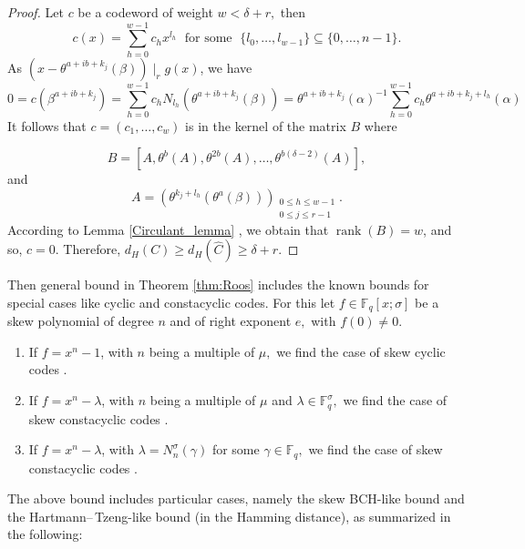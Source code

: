 \documentclass[12pt,paper]{article}
\theoremstyle{plain}
\newtheorem{remark}[theorem]{Remark}
\def\dsum #1#2{\displaystyle{\sum_{#1}^{#2}}}
\newcommand{\Fq}{\mathbb{F}_{q}}
\DeclareMathOperator{\rank}{rank}
\begin{document}
\begin{proof}
Let $c$ be a codeword of weight $ w <\delta+r, $ then 
				$$c(x) =\dsum{h=0}{w-1} c_{h}x^{l_h}\;\mbox{ for some }\;\{ l_{0},\ldots,l_{w-1}\}\subseteq\{ 0,\ldots,n-1\}. $$
As $ (x-{\theta^{a+ib+k_j}(\beta)}) \mid_r g(x)$, we have 
				$$ 0=c(\beta^{a+ib+k_j}) = \dsum{h=0}{w-1} c_{h} N_{l_h}(\theta^{a+ib+k_j}(\beta)) = \theta^{a+ib+k_j}(\alpha)^{-1}\dsum{h=0}{w-1} c_{h} \theta^{a+ib+k_j+l_h}(\alpha)$$
It follows that  $ c=(c_1,\ldots,c_w)$ is in the kernel of the matrix $B$ where 

            $$ B= \left[A, \theta^b(A),\theta^{2b}(A),\ldots, \theta^{b(\delta-2)}(A) \right], $$ 
            and  
            $$ 
            A=\left( \theta^{k_j+l_h}(\theta^a(\beta)) \right)_{\substack{0 \leq h \leq w-1 \\ 0 \leq j \leq r-1}}.$$
According to Lemma \ref{Circulant_lemma} , we obtain  that $\rank(B)=w$, and so, $c=0.$  
Therefore, $d_H(C) \geq d_H(\widehat{C}) \geq \delta+r.$ 
\end{proof} 


Then general bound in Theorem \ref{thm:Roos} includes the known bounds for special cases like cyclic and constacyclic codes. 
 For this let  $f\in \Fq[x;\sigma]$ be a skew polynomial of degree $n$ and of right exponent $e ,$ with $f(0)\ne 0.$ 
\begin{enumerate}
    \item If $f=x^n-1$, with $n$ being a multiple of $ \mu ,$  we find the case of skew cyclic codes \cite{Alfarano2021,Lobillo2017}.
      \item If $f=x^n-\lambda $, with $n$ being a multiple of $ \mu $ and $\lambda \in \Fq^{\sigma},$  we find the case of skew constacyclic codes \cite{Lobillo2025}.
      \item  If $f=x^n-\lambda $, with $\lambda= N_n^{\sigma}(\gamma) $ for some $\gamma \in \Fq, $  we find the case of skew constacyclic  codes  \cite{Cathryn2024}.
\end{enumerate}


The above bound includes particular cases, namely the skew BCH-like bound and the Hartmann–\,Tzeng-like bound (in the Hamming distance), as summarized in the following: 
\end{document}
